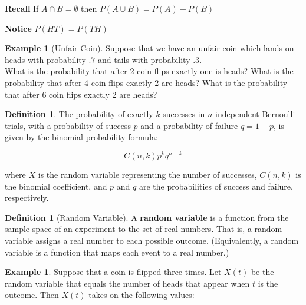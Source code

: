 \documentclass[letterpaper,10pt]{article}
\theoremstyle{plain}
\theoremstyle{definition}
\newtheorem{defn}[thm]{Definition}
\newtheorem{exmp}[thm]{Example}
\theoremstyle{remark}
\begin{document}
\noindent \textbf{Recall} If $A\cap B=\emptyset$ then $P(A \cup B)=P(A)+P(B)$

\noindent \textbf{Notice} $P(HT)=P(TH)$
\begin{exmp}[Unfair Coin]
Suppose that we have an unfair coin which lands on heads with probability $.7$ and tails with probability $.3$.
\\
What is the probability that after 2 coin flips exactly one is heads?
\newline
\vspace{1cm}
\newline
What is the probability that after 4 coin flips exactly 2 are heads?
\newline
\vspace{1cm}
\newline
What is the probability that after 6 coin flips exactly 2 are heads?
\newline
\vspace{1cm}


\end{exmp}
\begin{defn}
The probability of exactly \(k\) successes in \(n\) independent Bernoulli trials, with a probability of success \(p\) and a probability of failure \(q = 1 - p\), is given by the binomial probability formula:

\[
C(n, k) p^k q^{n-k}
\]

where \(X\) is the random variable representing the number of successes, \(C(n, k)\) is the binomial coefficient, and \(p\) and \(q\) are the probabilities of success and failure, respectively.

\end{defn}

\begin{defn}[Random Variable]
A \textbf{random variable} is a function from the sample space of an experiment to the set of real numbers. That is, a random variable assigns a real number to each possible outcome. (Equivalently, a random variable is a function that maps each event to a real number.)
\end{defn}

\begin{exmp}
Suppose that a coin is flipped three times. Let \(X(t)\) be the random variable that equals the
number of heads that appear when \(t\) is the outcome. Then \(X(t)\) takes on the following values:
\newline
\vspace{2cm}
\end{exmp}
\end{document}
